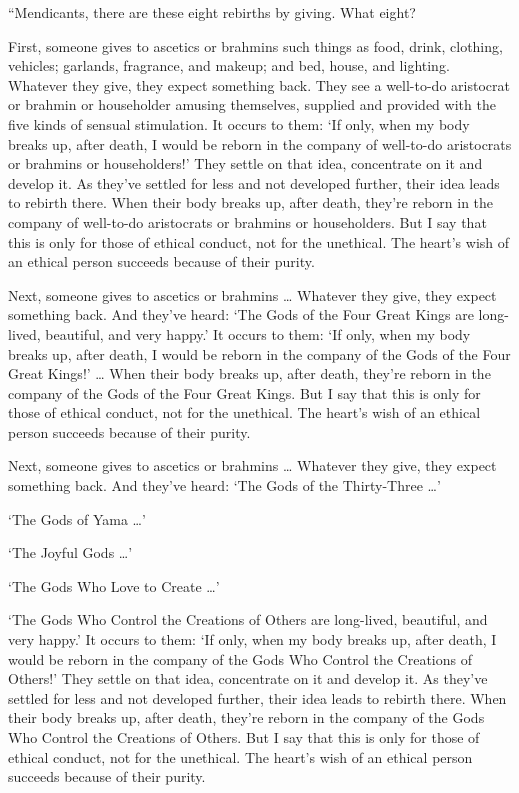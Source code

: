 \documentclass[12pt,openany]{book}%
\begin{document}
“Mendicants, there are these eight rebirths by giving. What eight? 

First, someone gives to ascetics or brahmins such things as food, drink, clothing, vehicles; garlands, fragrance, and makeup; and bed, house, and lighting. Whatever they give, they expect something back. They see a well-to-do aristocrat or brahmin or householder amusing themselves, supplied and provided with the five kinds of sensual stimulation. It occurs to them: ‘If only, when my body breaks up, after death, I would be reborn in the company of well-to-do aristocrats or brahmins or householders!’ They settle on that idea, concentrate on it and develop it. As they’ve settled for less and not developed further, their idea leads to rebirth there. When their body breaks up, after death, they’re reborn in the company of well-to-do aristocrats or brahmins or householders. But I say that this is only for those of ethical conduct, not for the unethical. The heart’s wish of an ethical person succeeds because of their purity. 

Next, someone gives to ascetics or brahmins … Whatever they give, they expect something back. And they’ve heard: ‘The Gods of the Four Great Kings are long-lived, beautiful, and very happy.’ It occurs to them: ‘If only, when my body breaks up, after death, I would be reborn in the company of the Gods of the Four Great Kings!’ … When their body breaks up, after death, they’re reborn in the company of the Gods of the Four Great Kings. But I say that this is only for those of ethical conduct, not for the unethical. The heart’s wish of an ethical person succeeds because of their purity. 

Next, someone gives to ascetics or brahmins … Whatever they give, they expect something back. And they’ve heard: ‘The Gods of the Thirty-Three …’ 

‘The Gods of Yama …’ 

‘The Joyful Gods …’ 

‘The Gods Who Love to Create …’ 

‘The Gods Who Control the Creations of Others are long-lived, beautiful, and very happy.’ It occurs to them: ‘If only, when my body breaks up, after death, I would be reborn in the company of the Gods Who Control the Creations of Others!’ They settle on that idea, concentrate on it and develop it. As they’ve settled for less and not developed further, their idea leads to rebirth there. When their body breaks up, after death, they’re reborn in the company of the Gods Who Control the Creations of Others. But I say that this is only for those of ethical conduct, not for the unethical. The heart’s wish of an ethical person succeeds because of their purity. 
\end{document}
